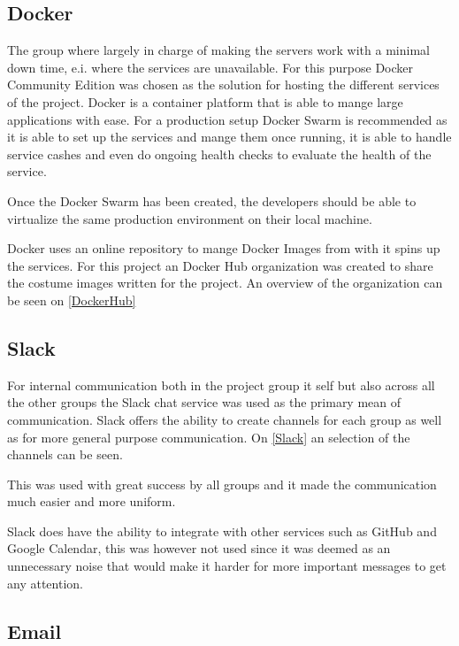 

\subsection{Docker}
The group where largely in charge of making the servers work with a minimal down time, e.i. where the services are unavailable.
For this purpose Docker Community Edition was chosen as the solution for hosting the different services of the project. 
Docker is a container platform that is able to mange large applications with ease. 
For a production setup Docker Swarm is recommended as it is able to set up the services and mange them once running, it is able to handle service cashes and even do ongoing health checks to evaluate the health of the service. 

Once the Docker Swarm has been created, the developers should be able to virtualize the same production environment on their local machine. 

Docker uses an online repository to mange Docker Images from with it spins up the services. 
For this project an Docker Hub organization was created to share the costume images written for the project. 
An overview of the organization can be seen on \autoref{DockerHub}


\subsection{Slack}
For internal communication both in the project group it self but also across all the other groups the Slack chat service was used as the primary mean of communication. 
Slack offers the ability to create channels for each group as well as for more general purpose communication. 
On \autoref{Slack} an selection of the channels can be seen. 


This was used with great success by all groups and it made the communication much easier and more uniform. 

Slack does have the ability to integrate with other services such as GitHub and Google Calendar, this was however not used since it was deemed as an unnecessary noise that would make it harder for more important messages to get any attention. 

\subsection{Email}
